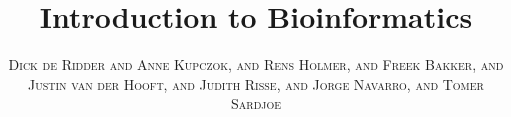\documentclass[a4paper,11pt,oneside]{book}
\title{\Huge \textbf{Introduction to Bioinformatics}}
\author{\textsc{Dick de Ridder and Anne Kupczok,  and Rens Holmer,  and Freek Bakker,  and Justin van der Hooft,  and Judith Risse,  and Jorge Navarro,  and Tomer Sardjoe}}
\begin{document}
\sloppy

\frontmatter
\maketitle

\tableofcontents

\mainmatter

% 
% 












\printglossaries




\end{document}

